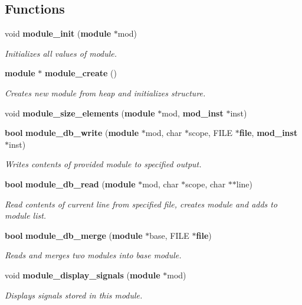 \subsection*{Functions}
\begin{CompactItemize}
\item 
void {\bf module\_\-init} ({\bf module} $\ast$mod)
\begin{CompactList}\small\item\em Initializes all values of module.\item\end{CompactList}\item 
{\bf module} $\ast$ {\bf module\_\-create} ()
\begin{CompactList}\small\item\em Creates new module from heap and initializes structure.\item\end{CompactList}\item 
void {\bf module\_\-size\_\-elements} ({\bf module} $\ast$mod, {\bf mod\_\-inst} $\ast$inst)
\item 
{\bf bool} {\bf module\_\-db\_\-write} ({\bf module} $\ast$mod, char $\ast$scope, FILE $\ast${\bf file}, {\bf mod\_\-inst} $\ast$inst)
\begin{CompactList}\small\item\em Writes contents of provided module to specified output.\item\end{CompactList}\item 
{\bf bool} {\bf module\_\-db\_\-read} ({\bf module} $\ast$mod, char $\ast$scope, char $\ast$$\ast$line)
\begin{CompactList}\small\item\em Read contents of current line from specified file, creates module and adds to module list.\item\end{CompactList}\item 
{\bf bool} {\bf module\_\-db\_\-merge} ({\bf module} $\ast$base, FILE $\ast${\bf file})
\begin{CompactList}\small\item\em Reads and merges two modules into base module.\item\end{CompactList}\item 
void {\bf module\_\-display\_\-signals} ({\bf module} $\ast$mod)
\begin{CompactList}\small\item\em Displays signals stored in this module.\item\end{CompactList}\item 
$$
\end{CompactItemize}
